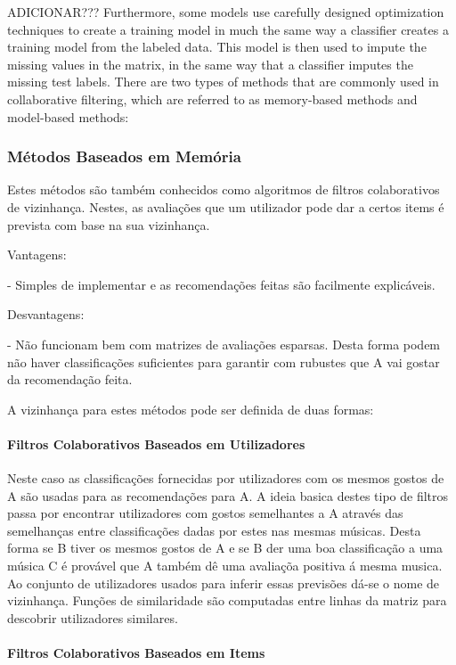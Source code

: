 ADICIONAR???
Furthermore, some models use carefully designed optimization techniques to create a training model in much the same way a classifier creates a training model from the labeled data. This model is then used to impute the missing values in the matrix, in the same way that a classifier imputes the missing test labels. There are two types of methods that are commonly used in collaborative filtering, which are referred to as memory-based methods and model-based methods:

\subsubsection{ Métodos Baseados em Memória}

 Estes métodos são também conhecidos como algoritmos de filtros colaborativos de vizinhança.
 Nestes, as avaliações que um utilizador pode dar a certos items é prevista com base na sua vizinhança.

Vantagens:

- Simples de implementar e as recomendações feitas são facilmente explicáveis.

Desvantagens:

- Não funcionam bem com matrizes de avaliações esparsas. Desta forma podem não haver classificações suficientes para garantir com rubustes que A vai gostar da recomendação feita.



A vizinhança para estes métodos pode ser definida de duas formas:

\paragraph{Filtros Colaborativos Baseados em Utilizadores} 

Neste caso as classificações fornecidas por utilizadores com os mesmos gostos de A são usadas para as recomendações para A. 
A ideia basica destes tipo de filtros passa por encontrar utilizadores com gostos semelhantes a A através das semelhanças entre classificações dadas por estes nas mesmas músicas. Desta forma se B tiver os mesmos gostos de A e se B der uma boa classificação a uma música C é provável que A também dê uma avaliaçõa positiva á mesma musica. Ao conjunto de utilizadores usados para inferir essas previsões dá-se o nome de vizinhança.
Funções de similaridade são computadas entre linhas da matriz para descobrir utilizadores similares.


\paragraph{Filtros Colaborativos Baseados em Items}

